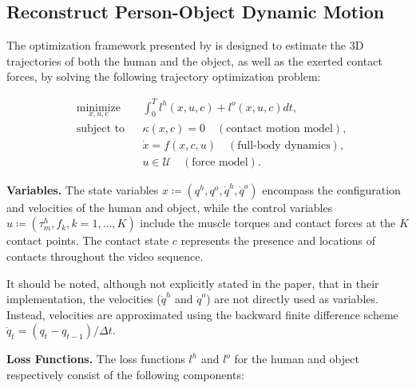 \subsection{Reconstruct Person-Object Dynamic Motion}
\label{subsec:reconstruct_original}

The optimization framework presented by \citet{li2019estimating} is designed to estimate the 3D trajectories of both the human and the object, 
as well as the exerted contact forces, by solving the following trajectory optimization problem: 

\begin{equation*}
    \begin{aligned}
        & \underset{x,u,c}{\text{minimize}}
        & & \int_{0}^{T} l^h(x, u, c) + l^o(x, u, c)dt, \\
        & \text{subject to}
        & & \kappa(x, c) = 0 \quad (\text{contact motion model}), \\
        &&& \dot{x} = f (x, c, u) \quad (\text{full-body dynamics}), \\
        &&& u \in \mathcal{U} \quad (\text{force model}).
    \end{aligned}
\end{equation*}

\noindent\textbf{Variables.} The state variables \(x \coloneqq (q^h, q^o, \dot{q}^h, \dot{q}^o)\) encompass the configuration and velocities of 
the human and object, while the control variables \(u \coloneqq (\tau_m^h, f_k, k=1, \dots, K)\) include the muscle torques and contact forces 
at the \(K\) contact points. The contact state \(c\) represents the presence and locations of contacts throughout the video sequence. 

It should be noted, although not explicitly stated in the paper, that in their implementation, the velocities (\(\dot{q}^h\) and \(\dot{q}^o\))
are not directly used as variables. Instead, velocities are approximated using the backward finite difference scheme 
\(\dot{q}_t = (q_t - q_{t - 1}) / \Delta t\).

\noindent\textbf{Loss Functions.} The loss functions \(l^h\) and \(l^o\) for the human and object respectively consist of the following components:

